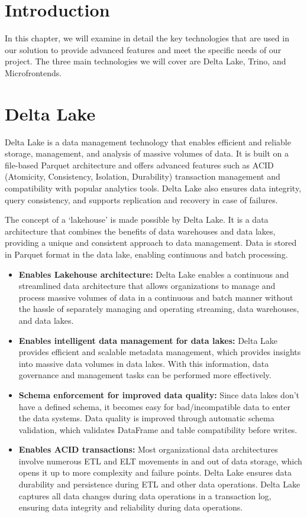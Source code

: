 \section*{Introduction}
In this chapter, we will examine in detail the key technologies that are used in our solution to provide advanced features and meet the specific needs of our project. The three main technologies we will cover are Delta Lake, Trino, and Microfrontends.

\section{Delta Lake}

Delta Lake is a data management technology that enables efficient and reliable storage, management, and analysis of massive volumes of data. It is built on a file-based Parquet architecture and offers advanced features such as ACID (Atomicity, Consistency, Isolation, Durability) transaction management and compatibility with popular analytics tools. Delta Lake also ensures data integrity, query consistency, and supports replication and recovery in case of failures.

The concept of a `lakehouse' is made possible by Delta Lake. It is a data architecture that combines the benefits of data warehouses and data lakes, providing a unique and consistent approach to data management. Data is stored in Parquet format in the data lake, enabling continuous and batch processing.
\begin{itemize}
\item \textbf{Enables Lakehouse architecture:} Delta Lake enables a continuous and streamlined data architecture that allows organizations to manage and process massive volumes of data in a continuous and batch manner without the hassle of separately managing and operating streaming, data warehouses, and data lakes.
\item \textbf{Enables intelligent data management for data lakes:} Delta Lake provides efficient and scalable metadata management, which provides insights into massive data volumes in data lakes. With this information, data governance and management tasks can be performed more effectively.
\item \textbf{Schema enforcement for improved data quality:} Since data lakes don't have a defined schema, it becomes easy for bad/incompatible data to enter the data systems. Data quality is improved through automatic schema validation, which validates DataFrame and table compatibility before writes.
\item \textbf{Enables ACID transactions:} Most organizational data architectures involve numerous ETL and ELT movements in and out of data storage, which opens it up to more complexity and failure points. Delta Lake ensures data durability and persistence during ETL and other data operations. Delta Lake captures all data changes during data operations in a transaction log, ensuring data integrity and reliability during data operations.
\end{itemize}

